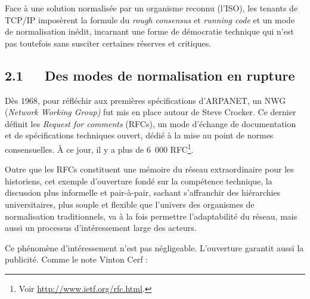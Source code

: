 \documentclass{FramateX}
\begin{document}
\begin{refsection}
Face à une solution normalisée par un organisme reconnu
(l'ISO), les tenants de TCP/IP imposèrent la formule
du \textit{rough consensus} et \textit{running code} et un mode de
normalisation inédit, incarnant une forme de démocratie technique qui
n'est pas toutefois sans susciter certaines réserves
et critiques.

\subsection*{2.1~~~Des modes de normalisation en rupture}
{}

Dès 1968, pour réfléchir aux premières spécifications
d'ARPANET, un NWG (\textit{Network Working Group)}
fut mis en place autour de Steve Crocker. Ce dernier définit les
\textit{Request for comments} (RFCs), un mode
d'échange de documentation et de spécifications
techniques ouvert, dédié à la mise au point de normes consensuelles. À
ce jour, il y a plus de 6~000
RFC\footnote{Voir \url{http://www.ietf.org/rfc.html}.}. 

Outre que les RFCs constituent une mémoire du réseau extraordinaire pour
les historiens, cet exemple d'ouverture fondé sur la
compétence technique, la discussion plus informelle et pair-à-pair,
sachant s'affranchir des hiérarchies universitaires,
plus souple et flexible que l'univers des organismes
de normalisation traditionnels, va à la fois permettre
l'adaptabilité du réseau, mais aussi un processus
d'intéressement large des acteurs. 

Ce phénomène d'intéressement n'est pas
négligeable. L'ouverture garantit aussi la publicité.
Comme le note Vinton Cerf :


\end{refsection}
\end{document}
